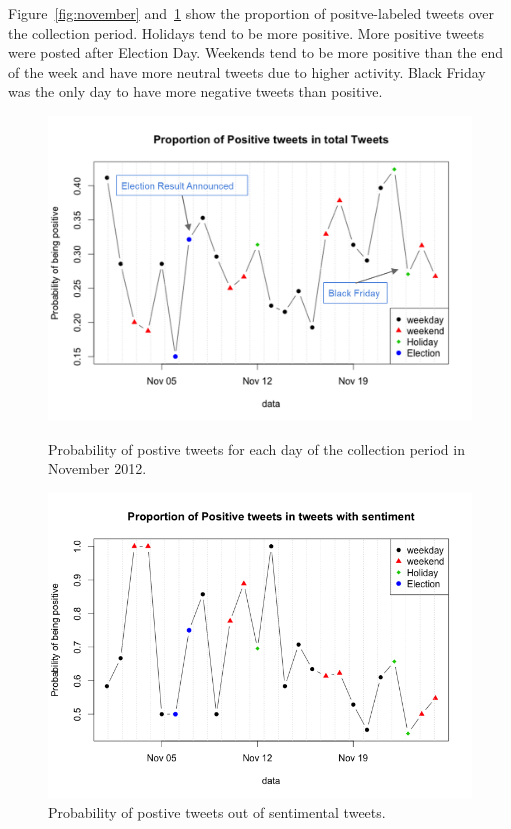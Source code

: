 Figure~\ref{fig:november} and~\ref{fig:november2} show the proportion of positve-labeled
tweets over the collection period. Holidays tend to be more positive.
More positive tweets were posted after Election Day. Weekends tend to
be more positive than the end of the week and have more neutral
tweets due to higher activity. Black Friday was the only day to have
more negative tweets than positive.

\begin{figure}[htb]
      \includegraphics[width=\linewidth]{figs/sentiment.png}
\caption{Probability of postive tweets for each day of the collection period in November 2012.}
\label{fig:november}
    \endminipage\hfill
      \includegraphics[width=\linewidth]{figs/sentiment2.png}
\caption{Probability of postive tweets out of sentimental tweets.}
\label{fig:november2}
    \endminipage
\end{figure}



